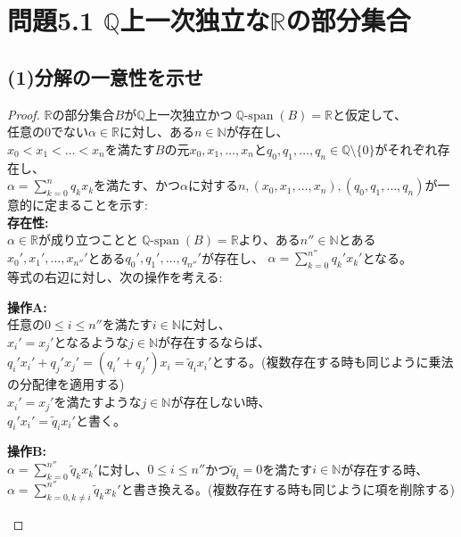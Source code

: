 \documentclass{jreport}
\DeclareMathOperator{\spn}{\mathbb{Q}-span}
\begin{document}
\section{問題5.1 $\mathbb{Q}$上一次独立な$\mathbb{R}$の部分集合}
\subsection{(1)分解の一意性を示せ}
\begin{proof}
	$\mathbb{R}$の部分集合$B$が$\mathbb{Q}$上一次独立かつ$\spn{(B)} =\mathbb{R}$と仮定して、\\
任意の$0$でない$\alpha \in \mathbb{R}$に対し、ある$n \in \mathbb{N}$が存在し、\\
$x_0< x_1< \ldots <x_n$を満たす$B$の元$x_0,x_1,\ldots ,x_n$と$q_0,q_1,\ldots,q_n \in \mathbb{Q}\setminus \{0\}$がそれぞれ存在し、\\
$\alpha = \sum\limits_{k=0}^n q_k x_k$を満たす、かつ$\alpha$に対する$n,(x_0,x_1,\ldots,x_n),(q_0,q_1,\ldots,q_n)$が一意的に定まることを示す:\\
\textbf{存在性:}\\
	$\alpha \in \mathbb{R}$が成り立つことと$\spn{(B)} =\mathbb{R}$より、ある$n'' \in \mathbb{N}$とある$x_0',x_1',\ldots,x_{n''}'$とある$q_0',q_1',\ldots,q_{n''}'$が存在し、
	$\alpha = \sum\limits_{k=0}^{n''}q_k'x_k'$となる。\\
等式の右辺に対し、次の操作を考える:
	\begin{framed}
		\textbf{操作A:}\\
		任意の$0 \le i \le n''$を満たす$i \in \mathbb{N}$に対し、\\
		$x_i' =x_j'$となるような$j \in \mathbb{N}$が存在するならば、\\
		$q_i'x_i'+q_j'x_j'=(q_i'+q_j')x_i=\tilde{q}_ix_i'$とする。(複数存在する時も同じように乗法の分配律を適用する)\\
		$x_i' =x_j'$を満たすような$j \in \mathbb{N}$が存在しない時、\\
		$q_i'x_i'=\tilde{q}_ix_i'$と書く。\\
	\end{framed}
	\begin{framed}
		\textbf{操作B:}\\
		$\alpha = \sum\limits_{k=0}^{n''}\tilde{q}_kx_k'$に対し、$0\le i \le n''$かつ$\tilde{q}_i =0$を満たす$i \in \mathbb{N}$が存在する時、\\
		$\alpha = \sum\limits_{k=0,k \ne i}^{n''}\tilde{q}_kx_k'$と書き換える。(複数存在する時も同じように項を削除する)\\

\end{framed}
\end{proof}
\end{document}
